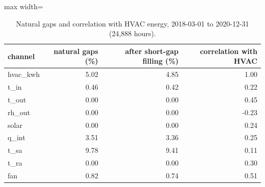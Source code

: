 \begin{table}[H]
\centering\small
\caption{Natural gaps and correlation with HVAC energy, 2018-03-01 to 2020-12-31 (24,888 hours).}\label{tab:gaps}
\begin{adjustbox}{max width=\textwidth}
\begin{tabular}{lrrr}
\toprule
channel & natural gaps (\%) & after short-gap filling (\%) & correlation with HVAC \\
\midrule
hvac\_kwh & 5.02 & 4.85 & 1.00 \\
t\_in & 0.46 & 0.42 & 0.22 \\
t\_out & 0.00 & 0.00 & 0.45 \\
rh\_out & 0.00 & 0.00 & -0.23 \\
solar & 0.00 & 0.00 & 0.24 \\
q\_int & 3.51 & 3.36 & 0.25 \\
t\_sa & 9.78 & 9.41 & 0.11 \\
t\_ra & 0.00 & 0.00 & 0.30 \\
fan & 0.82 & 0.74 & 0.51 \\
\bottomrule
\end{tabular}
\end{adjustbox}
\end{table}
